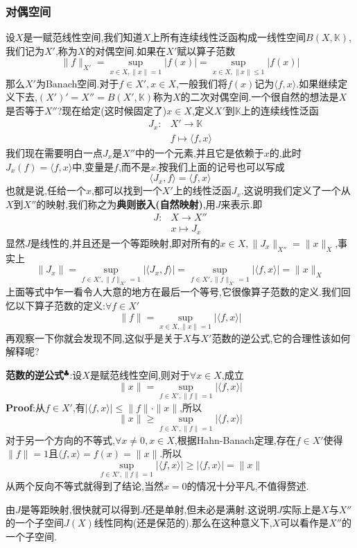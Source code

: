 \subsubsection{对偶空间}
设$X$是一赋范线性空间,我们知道$X$上所有连续线性泛函构成一线性空间$B(X,\mathbb{K})$,我们记为$X'$,称为$X$的对偶空间.如果在$X'$赋以算子范数
$$
\|f\|_{X'}=\sup_{x\in X,\|x\|=1}|f(x)|=\sup_{x\in X,\|x\|\leqslant 1}|f(x)|
$$
那么$X'$为Banach空间.对于$f\in X',x\in X$,一般我们将$f(x)$记为$\langle f,x\rangle$.如果继续定义下去,$(X')'=X''=B(X',\mathbb{K})$称为$X$的二次对偶空间.一个很自然的想法是$X$是否等于$X''$?现在给定(这时候固定了)$x\in X$,定义$X'$到$\mathbb{K}$上的连续线性泛函
$$
\begin{aligned}
    J_{x}:&X'\to \mathbb{K}\\
          &f\mapsto \langle f,x\rangle
\end{aligned}
$$
我们现在需要明白一点$J_{x}$是$X''$中的一个元素,并且它是依赖于$x$的,此时$J_{x}(f)=\langle f,x\rangle$中,变量是$f$,而不是$x$.按我们上面的记号也可以写成
$$
\langle J_{x},f\rangle =\langle f,x\rangle
$$
也就是说,任给一个$x$,都可以找到一个$X'$上的线性泛函$J_{x}$.这说明我们定义了一个从$X$到$X''$的映射,我们称之为\textbf{典则嵌入(自然映射)},用$J$来表示.即
$$
\begin{aligned}
    J:&X\to X''\\
      &x\mapsto J_{x}
\end{aligned}
$$
显然$J$是线性的,并且还是一个等距映射,即对所有的$x\in X,\|J_{x}\|_{X''}=\|x\|_{X}$,事实上
$$
\|J_{x}\|=\sup_{f\in X',\|f\|_{X'}=1}|\langle J_{x},f\rangle|=\sup_{f\in X',\|f\|_{X'}=1}|\langle f,x\rangle|=\|x\|_{X}
$$
上面等式中乍一看令人大意的地方在最后一个等号,它很像算子范数的定义.我们回忆以下算子范数的定义:$\forall f\in X'$
$$
\|f\|=\sup_{x\in X,\|x\|=1}|\langle f,x\rangle|
$$
再观察一下你就会发现不同,这似乎是关于$X$与$X'$范数的逆公式,它的合理性该如何解释呢?\par
\textbf{范数的逆公式\hypertarget{范数的逆公式}{}}$^\clubsuit $:设$X$是赋范线性空间,则对于$\forall x\in X$,成立
$$
\|x\|=\sup_{f\in X',\|f\|=1}|\langle f,x\rangle|
$$
\qquad \textbf{Proof}:从$f\in X'$,有$|\langle f,x\rangle|\leqslant \|f\|\cdot\|x\|$,所以
$$
\|x\|\geqslant \sup_{f\in X',\|f\|=1}|\langle f,x\rangle|
$$
对于另一个方向的不等式,$\forall x\neq 0,x\in X$,根据Hahn-Banach定理,存在$f\in X'$使得$\|f\|=1$且$\langle f,x\rangle=f(x)=\|x\|$.所以
$$
\sup_{f\in X',\|f\|=1}|\langle f,x\rangle|\geqslant|\langle f,x\rangle|=\|x\|
$$
从两个反向不等式就得到了结论,当然$x=0$的情况十分平凡,不值得赘述.\par
由$J$是等距映射,很快就可以得到$J$还是单射,但未必是满射.这说明$J$实际上是$X$与$X''$的一个子空间$J(X)$线性同构(还是保范的).那么在这种意义下,$X$可以看作是$X''$的一个子空间.\par
